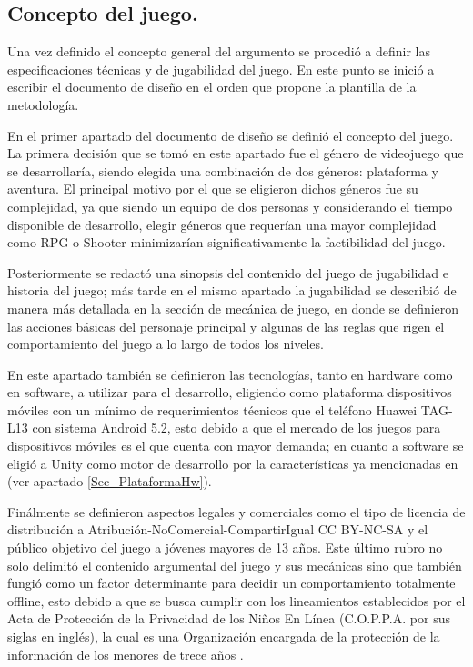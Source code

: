 \subsection{Concepto del juego.}
Una vez definido el concepto general del argumento se procedió a definir 
las especificaciones técnicas y de jugabilidad del juego. En este punto se 
inició a escribir el documento de diseño en el orden que propone la plantilla 
de la metodología. 
\\
\par
En el primer apartado del documento de diseño se definió el concepto del juego. 
La primera decisión que se tomó en este apartado fue el género de videojuego que 
se desarrollaría, siendo elegida una combinación de dos géneros: plataforma y 
aventura. El principal motivo por el que se eligieron dichos géneros fue su 
complejidad, ya que siendo un equipo de dos personas y considerando el tiempo 
disponible de desarrollo, elegir géneros que requerían una mayor complejidad 
como RPG o Shooter minimizarían significativamente la factibilidad del juego.  
\\
\par
Posteriormente se redactó una sinopsis del contenido del juego de jugabilidad e 
historia del juego; más tarde en el mismo apartado la jugabilidad se describió 
de manera más detallada en la sección de mecánica de juego, en donde se 
definieron las acciones básicas del personaje principal y algunas de las reglas 
que rigen el comportamiento del juego a lo largo de todos los niveles. 
\\
\par
En este apartado también se definieron las tecnologías, tanto en hardware como 
en software, a utilizar para el desarrollo, eligiendo como plataforma dispositivos 
móviles con un mínimo de requerimientos técnicos que el teléfono Huawei TAG-L13 
con sistema Android 5.2, esto debido a que el mercado de los juegos para 
dispositivos móviles es el que cuenta con mayor demanda\cite{Ref_IndusMEx}; en 
cuanto a software se eligió a Unity como motor de desarrollo por la 
características ya mencionadas en (ver apartado \ref{Sec_PlataformaHw}). 
\\
\par
Finálmente se definieron aspectos legales y comerciales como el tipo de licencia 
de distribución a Atribución-NoComercial-CompartirIgual CC BY-NC-SA y el público 
objetivo del juego a jóvenes mayores de 13 años. Este último rubro no solo delimitó 
el contenido argumental del juego y sus mecánicas sino que también fungió como un 
factor determinante para decidir un comportamiento totalmente offline, esto 
debido a que se busca cumplir con los lineamientos establecidos por el Acta de 
Protección de la Privacidad de los Niños En Línea (C.O.P.P.A. por sus siglas en 
inglés), la cual es una Organización encargada de la protección de la información 
de los menores de trece años \cite{RefCOPPA}. 
